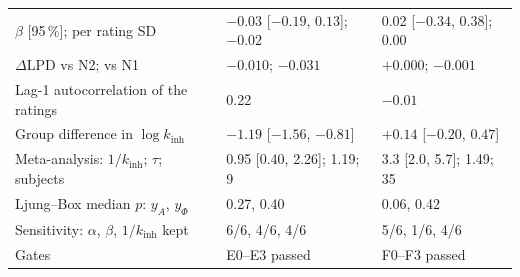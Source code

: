 \documentclass[12pt,a4paper]{article}
\theoremstyle{plain}
\theoremstyle{definition}
\theoremstyle{remark}
\newcommand{\kinh}{k_{\mathrm{inh}}}
\begin{document}
\begin{table}[htbp]
\begin{tabular}{lll}
$\beta$ [95\,\%]; per rating SD         & $-0.03$ [$-0.19$, $0.13$]; $-0.02$ & 0.02 [$-0.34$, $0.38$]; 0.00 \\
$\Delta$LPD vs N2; vs N1                 & $-0.010$; $-0.031$ & $+0.000$; $-0.001$ \\
Lag-1 autocorrelation of the ratings     & 0.22 & $-0.01$ \\
Group difference in $\log\kinh$          & $-1.19$ [$-1.56$, $-0.81$] & $+0.14$ [$-0.20$, $0.47$] \\
Meta-analysis: $1/\kinh$; $\tau$; subjects & 0.95 [0.40, 2.26]; 1.19; 9 & 3.3 [2.0, 5.7]; 1.49; 35 \\
Ljung--Box median $p$: $y_A$, $y_\Phi$   & 0.27, 0.40 & 0.06, 0.42 \\
Sensitivity: $\alpha$, $\beta$, $1/\kinh$ kept & 6/6, 4/6, 4/6 & 5/6, 1/6, 4/6 \\
Gates                                    & E0--E3 passed & F0--F3 passed \\
\bottomrule
\end{tabular}
\end{table}
\end{document}
